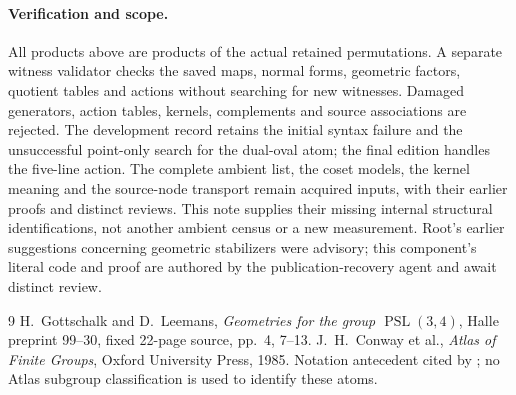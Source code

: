 \documentclass[11pt]{article}
\newcommand{\PSL}{\operatorname{PSL}}\newcommand{\SL}{\operatorname{SL}}\newcommand{\GL}{\operatorname{GL}}
\begin{document}
\paragraph{Verification and scope.}
All products above are products of the actual retained permutations.
A separate witness validator checks the saved maps, normal forms,
geometric factors, quotient tables and actions without searching for
new witnesses. Damaged generators, action tables, kernels, complements
and source associations are rejected. The development record retains
the initial syntax failure and the unsuccessful point-only search for
the dual-oval atom; the final edition handles the five-line action.
The complete ambient list, the coset models, the kernel meaning and
the source-node transport remain acquired inputs, with their earlier
proofs and distinct reviews. This note supplies their missing internal
structural identifications, not another ambient census or a new
measurement. Root's earlier suggestions concerning geometric
stabilizers were advisory; this component's literal code and proof are
authored by the publication-recovery agent and await distinct review.

\begin{thebibliography}{9}
 H.~Gottschalk and D.~Leemans,
\emph{Geometries for the group $\PSL(3,4)$},
Halle preprint 99--30, fixed 22-page source, pp.~4, 7--13.
 J.~H.~Conway et al., \emph{Atlas of Finite Groups},
Oxford University Press, 1985. Notation antecedent cited by \cite{GL};
no Atlas subgroup classification is used to identify these atoms.
\end{thebibliography}
\end{document}
